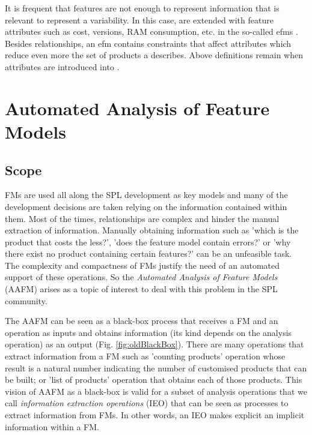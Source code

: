 It is frequent that features are not enough to represent information that is relevant to represent a \spl variability. In this case, \fms are extended with feature attributes such as cost, versions, RAM consumption, etc. in the so-called \Glspl{efm} \cite{benavides05-CAISE}. Besides relationships, an \Gls{efm} contains constraints that affect attributes which reduce even more the set of products a \fm describes. Above definitions remain when attributes are introduced into \fms. 

\section{Automated Analysis of Feature Models}

\subsection{Scope}

FMs are used all along the SPL development as key models and many of the development decisions are taken relying on the information contained within them. Most of the times, relationships are complex and hinder the manual extraction of information. Manually obtaining information such as 'which is the product that costs the less?', 'does the feature model contain errors?' or 'why there exist no product containing certain features?' can be an unfeasible task. The complexity and compactness of FMs justify the need of an automated support of these operations. So the \textit{Automated Analysis of Feature Models} (AAFM) arises as a topic of interest to deal with this problem in the SPL community.


The AAFM can be seen as a black-box process that receives a FM and an operation as inputs and obtains information (its kind depends on the analysis operation) as an output (Fig. \ref{fig:oldBlackBox}). There are many operations that extract information from a FM such as 'counting products' operation whose result is a natural number indicating the number of customised products that can be built; or 'list of products' operation that obtains each of those products. This vision of AAFM as a black-box is valid for a subset of analysis operations that we call \emph{information extraction operations} (IEO) that can be seen as processes to extract information from FMs. In other words, an IEO makes explicit an implicit information within a FM. 

